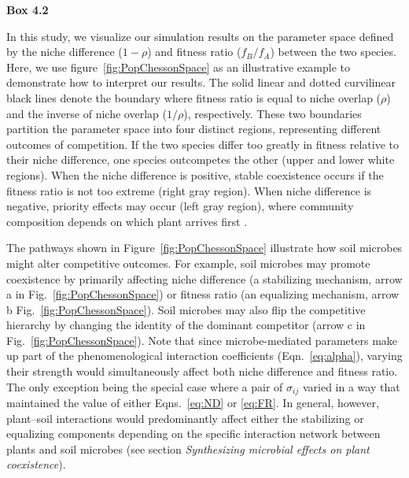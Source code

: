\clearpage
\begin{flushleft}
	\textbf{Box 4.2}
\end{flushleft}
\begin{infobox}

In this study, we visualize our simulation results on the parameter space defined by the niche difference ($1-\rho$) and fitness ratio ($f_{B} / f_{A}$) between the two species. Here, we use figure~\ref{fig:PopChessonSpace} as an illustrative example to demonstrate how to interpret our results. The solid linear and dotted curvilinear black lines denote the boundary where fitness ratio is equal to niche overlap ($\rho$) and the inverse of niche overlap ($1 / \rho$), respectively. These two boundaries partition the parameter space into four distinct regions, representing different outcomes of competition. If the two species differ too greatly in fitness relative to their niche difference, one species outcompetes the other (upper and lower white regions). When the niche difference is positive, stable coexistence occurs if the fitness ratio is not too extreme (right gray region). When niche difference is negative, priority effects may occur (left gray region), where community composition depends on which plant arrives first \citep{Mordecai2011, KeLetten2018}.
\par


The pathways shown in Figure~\ref{fig:PopChessonSpace} illustrate how soil microbes might alter competitive outcomes. For example, soil microbes may promote coexistence by primarily affecting niche difference (a stabilizing mechanism, arrow a in Fig.~\ref{fig:PopChessonSpace}) or fitness ratio (an equalizing mechanism, arrow b Fig.~\ref{fig:PopChessonSpace}). Soil microbes may also flip the competitive hierarchy by changing the identity of the dominant competitor (arrow c in Fig.~\ref{fig:PopChessonSpace}).
Note that since microbe-mediated parameters make up part of the phenomenological interaction coefficients (Eqn.~\ref{eq:alpha}), varying their strength would simultaneously affect both niche difference and fitness ratio.
The only exception being the special case where a pair of $\sigma_{ij}$ varied in a way that maintained the value of either Eqns.~\ref{eq:ND} or \ref{eq:FR}.
In general, however, plant--soil interactions would predominantly affect either the stabilizing or equalizing components depending on the specific interaction network between plants and soil microbes (see section \textit{Synthesizing microbial effects on plant coexistence}).
\end{infobox}